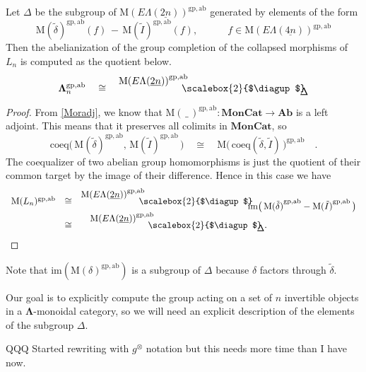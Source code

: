 \documentclass{amsbook} %
\newcommand{\mb}{\mathbf}
\newcommand{\ML}{\mathbf{\Lambda}}
\newcommand{\MLn}{\mathbf{\Lambda}_n}
\newcommand{\bigquotient}[2]{ \raisebox{0.75\height}{$#1$} \mkern-12mu\scalebox{2}{$\diagup$}\mkern-10mu \raisebox{-0.5\height}{$#2$} }
\newcommand{\ELnn}{E\Lambda(\underline{2n})}
\newcommand{\ELnnnn}{E\Lambda(\underline{4n})}
\newcommand{\moncat}{\ensuremath{\mb{MonCat}}}
\numberwithin{section}{chapter}
\begin{document}
\begin{prop}\label{Zmor2} Let $\Delta$ be the subgroup of $\mathrm{M}(\ELnn)^{\mathrm{gp, ab}}$ generated by elements of the form
\[ \mathrm{M}(\tilde{\delta})^{\mathrm{gp, ab}}(f) \, - \, \mathrm{M}(\tilde{I})^{\mathrm{gp, ab}}(f), \quad \quad \quad f \in \mathrm{M}(\ELnnnn)^{\mathrm{gp, ab}} \]
Then the abelianization of the group completion of the collapsed morphisms of $L_n$ is computed as the quotient below.
\[ \MLn^{\mathrm{gp, ab}} \quad \cong \quad \bigquotient{{\mathrm{M}(\ELnn)}^{\mathrm{gp, ab}}}{\Delta} \]
\end{prop}
\begin{proof}
From \cref{Moradj}, we know that $\mathrm{M}(\, \_ \,)^{\mathrm{gp, ab}}: \moncat \to \mb{Ab}$ is a left adjoint. This means that it preserves all colimits in $\moncat$, so
\[ \mathrm{coeq}\big( \, \mathrm{M}(\tilde{\delta})^{\mathrm{gp, ab}}, \, \mathrm{M}(\tilde{I})^{\mathrm{gp, ab}} \, \big) \quad \cong \quad \mathrm{M}\big( \, \mathrm{coeq}(\tilde{\delta}, \tilde{I}) \, \big)^{\mathrm{gp, ab}} \quad. \]
The coequalizer of two abelian group homomorphisms is just the quotient of their common target by the image of their difference. Hence in this case we have
\[ 
\begin{array}{rcl}
\mathrm{M}(L_{n})^{\mathrm{gp, ab}}  & \cong &  \bigquotient{{\mathrm{M}(\ELnn)}^{\mathrm{gp, ab}}}{\mathrm{im}\big( \, {\mathrm{M}(\tilde{\delta})}^{\mathrm{gp, ab}} - {\mathrm{M}(\tilde{I})}^{\mathrm{gp, ab}} \, \big)} \\
& \cong & \quad \bigquotient{{\mathrm{M}(\ELnn)}^{\mathrm{gp, ab}}}{\Delta}.
\end{array}
\]
\end{proof} 

\begin{rem}\label{delta_neq_image}
Note that $\mathrm{im}(\mathrm{M}(\delta)^{\mathrm{gp, ab}})$ is a subgroup of $\Delta$ because $\delta$ factors through $\tilde{\delta}$.
\end{rem}




Our goal is to explicitly compute the group acting on a set of $n$ invertible objects in a $\ML$-monoidal category, so we will need an explicit description of the elements of the subgroup $\Delta$.

QQQ Started rewriting with $g^{\otimes}$ notation but this needs more time than I have now.
\end{document}
